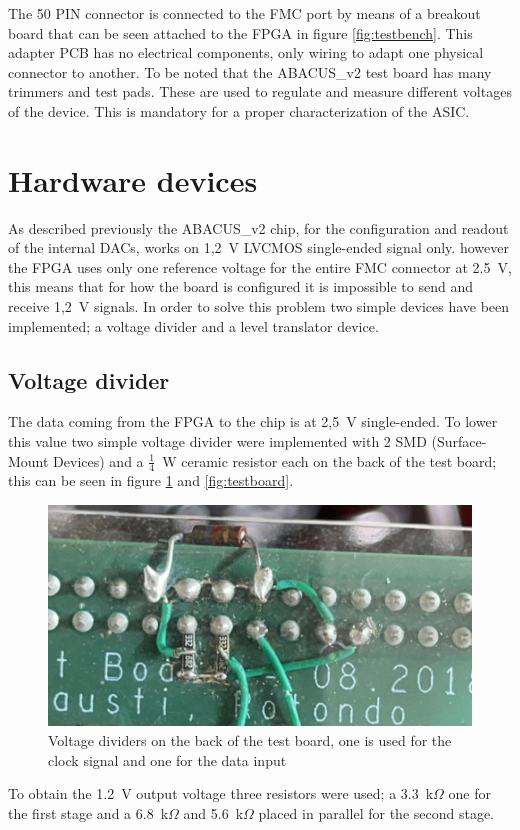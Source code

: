 \noindent The 50 PIN connector is connected to the FMC port by means of a breakout board that can be seen attached to the FPGA in figure \ref{fig:testbench}. This adapter PCB has no electrical components, only wiring to adapt one physical connector to another.
To be noted that the ABACUS\_v2 test board has many trimmers and test pads. These are used to regulate and measure different voltages of the device. This is mandatory for a proper characterization of the ASIC.
\section{Hardware devices}\label{hardware}
\noindent As described previously the ABACUS\_v2 chip, for the configuration and readout of the internal DACs, works on 1,2~V LVCMOS single-ended signal only. however the FPGA uses only one reference voltage for the entire FMC connector at 2.5~V, this means that for how the board is configured it is impossible to send and receive 1,2~V signals.
In order to solve this problem two simple devices have been implemented; a voltage divider and a level translator device.
\subsection{Voltage divider}
The data coming from the FPGA to the chip is at 2,5~V single-ended. To lower this value two simple voltage divider were implemented with 2 SMD (Surface-Mount Devices) and a $\frac{1}{4}$~W ceramic resistor each on the back of the test board; this can be seen in figure \ref{fig:voltagedivider} and \ref{fig:testboard}.
\begin{figure}[H]
	\centering
	\includegraphics[width=0.6\linewidth]{IMG/ch5/VOLTAGEDIVIDER}
	\caption{Voltage dividers on the back of the test board, one is used for the clock signal and one for the data input}
	\label{fig:voltagedivider}
\end{figure}
\noindent To obtain the 1.2~V output voltage three resistors were used; a 3.3~k$\Omega$ one for the first stage and a 6.8~k$\Omega$ and 5.6~k$\Omega$ placed in parallel for the second stage.

